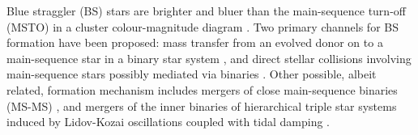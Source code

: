 \documentclass{aastex62}
\begin{document}
Blue straggler (BS) stars are brighter and bluer than the
main-sequence turn-off (MSTO) in a cluster colour-magnitude diagram
\citep[e.g.][]{1953AJ.....58...61S,2014ApJ...782...49S}.  Two
primary channels for BS formation have been proposed: mass transfer
from an evolved donor on to a main-sequence star in a binary star
system
\citep[e.g.][]{1964MNRAS.128..147M,1997A&A...328..143P,2009Natur.457..288K,2011MNRAS.410.2370L,2011Natur.478..356G},
and direct stellar collisions involving main-sequence stars possibly
mediated via binaries
\citep[e.g.][]{hills75,1997A&A...328..130P,2007ApJ...661..210L,2013MNRAS.428..897L,2013MNRAS.429.1221H,2018arXiv181100058P}.
Other possible, albeit related, formation mechanism includes mergers
of close main-sequence binaries (MS-MS) \cite{2018arXiv181100058P},
and mergers of the inner binaries of hierarchical triple star systems
induced by Lidov-Kozai oscillations coupled with tidal damping
\citep[e.g.][]{2009ApJ...697.1048P}.
\end{document}
